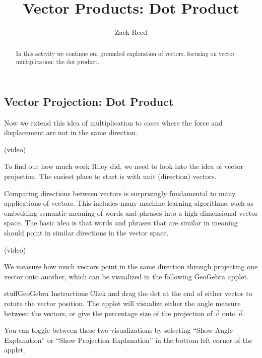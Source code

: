 \documentclass{ximera}
\title{Vector Products: Dot Product}
\author{Zack Reed}
\begin{document}
\begin{abstract}
In this activity we continue our grounded exploration of vectors, focusing on vector multiplication: the dot product.
\end{abstract}
\maketitle


\subsection*{Vector Projection: Dot Product}

Now we extend this idea of multiplication to cases where the force and displacement are not in the same direction.

(video)

To find out how much work Riley did, we need to look into the idea of vector projection. The easiest place to start is with unit (direction) vectors.

Comparing directions between vectors is surprisingly fundamental to many applications of vectors. This includes many machine learning algorithms, such as embedding semantic meaning of words and phrases into a high-dimensional vector space. The basic idea is that words and phrases that are similar in meaning should point in similar directions in the vector space. 

(video)

We measure how much vectors point in the same direction through projecting one vector onto another, which can be visualized in the following GeoGebra applet.

\begin{expandable}{stuff}{GeoGebra Instructions}
    Click and drag the dot at the end of either vector to rotate the vector position. The applet will visualize either the angle measure between the vectors, or give the percentage size of the projection of $\vec{v}$ onto $\vec{u}$.

    You can toggle between these two visualizations by selecting ``Show Angle Explanation'' or ``Show Projection Explanation'' in the bottom left corner of the applet.
\end{expandable}

\begin{center}
\end{center}
\end{document}
